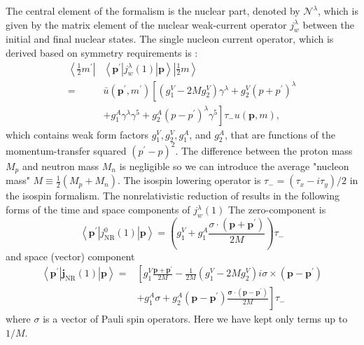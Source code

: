     The central element of the formalism is the nuclear part, denoted by $\mathcal{N}^\lambda$, which is given by the matrix element of the nuclear weak-current operator $j_w^\lambda$ between the initial and final nuclear states. The single nucleon current operator, which is derived based on symmetry requirements is \cite{Golak2014}:
    \begin{equation}
        \begin{aligned}
            \left\langle\frac{1}{2} m^{\prime}\right| & \left\langle\mathbf{p}^{\prime}\left|j_w^\lambda(1)\right| \mathbf{p}\right\rangle\left|\frac{1}{2} m\right\rangle \\
            = & \bar{u}\left(\mathbf{p}^{\prime}, m^{\prime}\right)\left[\left(g_1^V-2 M g_2^V\right) \gamma^\lambda+g_2^V\left(p+p^{\prime}\right)^\lambda\right. \\
            & \left.+g_1^A \gamma^\lambda \gamma^5+g_2^A\left(p-p^{\prime}\right)^\lambda \gamma^5\right] \tau_{-} u(\mathbf{p}, m),
        \end{aligned}
        \label{maincurr}
    \end{equation}
    which contains weak form factors $g_1^V, g_2^V, g_1^A$, and $g_2^A$, that are functions of the momentum-transfer squared $\left(p^{\prime}-p\right)^2$.
    The difference between the proton mass $M_p$ and neutron mass $M_n$ is negligible so we can introduce the average "nucleon mass" $M \equiv \frac{1}{2}\left(M_p+M_n\right)$.
    The isospin lowering operator is $\tau_{-}=\left(\tau_x-i \tau_y\right) / 2$ in the isospin formalism. 
    The nonrelativistic reduction of  results in the following forms of the time and space components of $j_w^\lambda(1)$
    The zero-component is
    \begin{equation}
        \left\langle\mathbf{p}^{\prime}\left|j_{\mathrm{NR}}^0(1)\right| \mathbf{p}\right\rangle=\left(g_1^V+g_1^A \frac{\sigma \cdot\left(\mathbf{p}+\mathbf{p}^{\prime}\right)}{2 M}\right) \tau_{-}
    \end{equation}
    and space (vector) component
    \begin{equation}
        \begin{aligned}
        \left\langle\mathbf{p}^{\prime}\left|\mathbf{j}_{\mathrm{NR}}(1)\right| \mathbf{p}\right\rangle= & {\left[g_1^V \frac{\mathbf{p}+\mathbf{p}^{\prime}}{2 M}-\frac{1}{2 M}\left(g_1^V-2 M g_2^V\right) i \sigma \times\left(\mathbf{p}-\mathbf{p}^{\prime}\right)\right.} \\
        & \left.+g_1^A \sigma+g_2^A\left(\mathbf{p}-\mathbf{p}^{\prime}\right) \frac{\boldsymbol{\sigma} \cdot\left(\mathbf{p}-\mathbf{p}^{\prime}\right)}{2 M}\right] \tau_{-}
        \end{aligned}    
    \end{equation}
    where $\sigma$ is a vector of Pauli spin operators. Here we have kept only terms up to $1 / M$.


